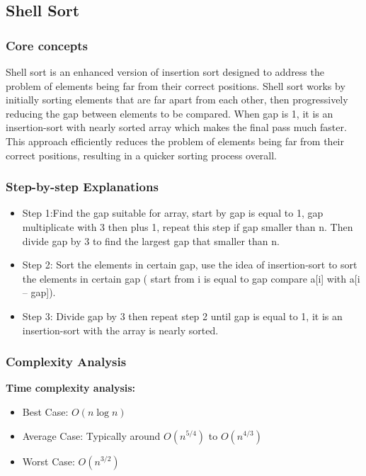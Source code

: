 \subsection{Shell Sort}

\subsubsection{Core concepts}
Shell sort is an enhanced version of insertion sort designed to address the problem of elements being far from their correct positions. Shell sort works by initially sorting elements that are far apart from each other, then progressively reducing the gap between elements to be compared. When gap is 1, it is an insertion-sort with nearly sorted array which makes the final pass much faster. This approach efficiently reduces the problem of elements being far from their correct positions, resulting in a quicker sorting process overall.

\vspace{10pt}

\subsubsection{Step-by-step Explanations}
\begin{itemize}[label=-]
    \item Step 1:Find the gap suitable for array, start by gap is equal to 1, gap multiplicate with 3 then plus 1, repeat this step if gap smaller than n. Then divide gap by 3 to find the largest gap that smaller than n.
    \item Step 2: Sort the elements in certain gap, use the idea of insertion-sort to sort the elements in certain gap ( start from i is equal to gap compare a[i] with a[i – gap]).
    \item Step 3: Divide gap by 3 then repeat step 2 until gap is equal to 1, it is an insertion-sort with the array is nearly sorted.
\end{itemize}

\subsubsection{Complexity Analysis}
\textbf{Time complexity analysis:} 
\begin{itemize}
    \item Best Case: $O(n \log n)$
    \item Average Case: Typically around $O(n^{5/4})$ to $O(n^{4/3})$
    \item Worst Case: $O(n^{3/2})$
\end{itemize}

